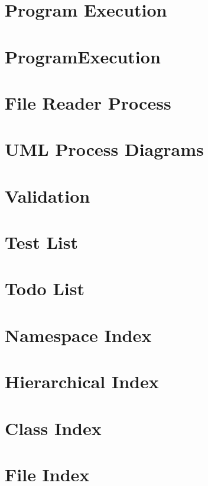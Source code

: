 \documentclass[twoside]{book}
\begin{document}
\chapter{Program Execution}
\label{program_execution}
\hypertarget{program_execution}{}

\chapter{Program\-Execution}
\label{_program_execution}
\hypertarget{_program_execution}{}

\chapter{File Reader Process}
\label{_u_m_l__file_reader}
\hypertarget{_u_m_l__file_reader}{}

\chapter{U\-M\-L Process Diagrams}
\label{_u_m_l__process}
\hypertarget{_u_m_l__process}{}

\chapter{Validation}
\label{_validation}
\hypertarget{_validation}{}

\chapter{Test List}
\label{test}
\hypertarget{test}{}

\chapter{Todo List}
\label{todo}
\hypertarget{todo}{}

\chapter{Namespace Index}

\chapter{Hierarchical Index}

\chapter{Class Index}

\chapter{File Index}

\end{document}
